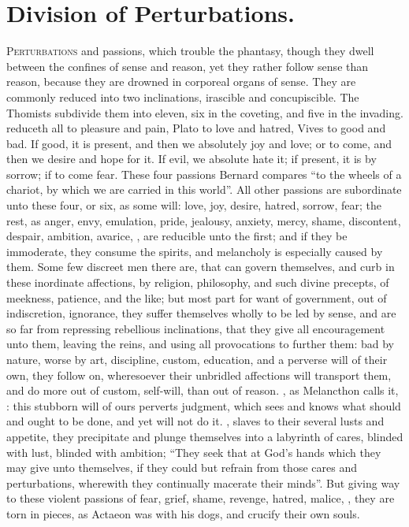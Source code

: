 \section{Division of Perturbations.}

\lettrine{P}{erturbations} and passions, which trouble the phantasy, though
they dwell between the confines of sense and reason, yet they rather follow
sense than reason, because they are drowned in corporeal organs of sense. They
are commonly reduced into two inclinations, irascible and
concupiscible. The Thomists subdivide them into eleven, six in the coveting,
and five in the invading. \Aristotle{} reduceth all to pleasure and pain, Plato to
love and hatred, Vives to good and bad. If good, it is
present, and then we absolutely joy and love; or to come, and then we desire
and hope for it. If evil, we absolute hate it; if present, it is by sorrow; if
to come fear. These four passions Bernard compares \enquote{to the
wheels of a chariot, by which we are carried in this world}. All other passions
are subordinate unto these four, or six, as some will: love, joy, desire,
hatred, sorrow, fear; the rest, as anger, envy, emulation, pride, jealousy,
anxiety, mercy, shame, discontent, despair, ambition, avarice, \etc{}, are
reducible unto the first; and if they be immoderate, they
consume the spirits, and melancholy is especially caused
by them. Some few discreet men there are, that can govern themselves, and curb
in these inordinate affections, by religion, philosophy, and such divine
precepts, of meekness, patience, and the like; but most part for want of
government, out of indiscretion, ignorance, they suffer themselves wholly to be
led by sense, and are so far from repressing rebellious inclinations, that they
give all encouragement unto them, leaving the reins, and using all provocations
to further them: bad by nature, worse by art, discipline,
custom, education, and a perverse will of their own, they
follow on, wheresoever their unbridled affections will transport them, and do
more out of custom, self-will, than out of reason. , as
Melancthon calls it, : this stubborn will of ours perverts
judgment, which sees and knows what should and ought to be done, and yet will
not do it. , slaves to their several lusts and appetite,
they precipitate and plunge themselves into a labyrinth of
cares, blinded with lust, blinded with ambition; \enquote{They
seek that at God's hands which they may give unto themselves, if they could but
refrain from those cares and perturbations, wherewith they continually macerate
their minds}. But giving way to these violent passions of fear, grief, shame,
revenge, hatred, malice, \etc{}, they are torn in pieces, as Actaeon was with
his dogs, and crucify their own souls.

